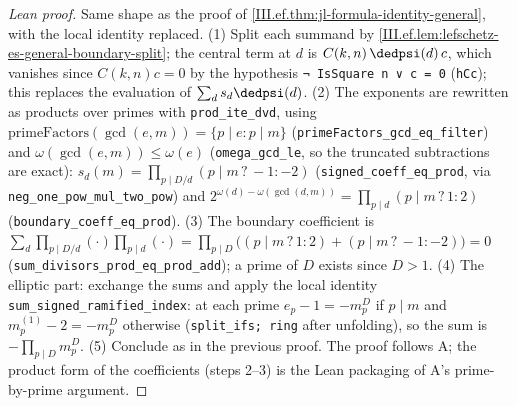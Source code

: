 \begin{proof}[Lean proof]
Same shape as the proof of \cref{III.ef.thm:jl-formula-identity-general}, with the local identity replaced. (1) Split each summand by \cref{III.ef.lem:lefschetz-es-general-boundary-split}; the central term at $d$ is $C(k,n)\,\dedpsi(d)\,c$, which vanishes since $C(k,n)c=0$ by the hypothesis \texttt{¬ IsSquare n ∨ c = 0} (\texttt{hCc}); this replaces the evaluation of $\sum_ds_d\dedpsi(d)$. (2) The exponents are rewritten as products over primes with \texttt{prod\_ite\_dvd}, using $\mathrm{primeFactors}(\gcd(e,m))=\{p\mid e: p\mid m\}$ (\texttt{primeFactors\_gcd\_eq\_filter}) and $\omega(\gcd(e,m))\le\omega(e)$ (\texttt{omega\_gcd\_le}, so the truncated subtractions are exact): $s_d(m)=\prod_{p\mid D/d}(p\mid m\,?\,-1:-2)$ (\texttt{signed\_coeff\_eq\_prod}, via \texttt{neg\_one\_pow\_mul\_two\_pow}) and $2^{\omega(d)-\omega(\gcd(d,m))}=\prod_{p\mid d}(p\mid m\,?\,1:2)$ (\texttt{boundary\_coeff\_eq\_prod}). (3) The boundary coefficient is $\sum_d\prod_{p\mid D/d}(\cdot)\prod_{p\mid d}(\cdot)=\prod_{p\mid D}\bigl((p\mid m\,?\,1:2)+(p\mid m\,?\,-1:-2)\bigr)=0$ (\texttt{sum\_divisors\_prod\_eq\_prod\_add}); a prime of $D$ exists since $D>1$. (4) The elliptic part: exchange the sums and apply the local identity \texttt{sum\_signed\_ramified\_index}: at each prime $e_p-1=-m^D_p$ if $p\mid m$ and $m^{(1)}_p-2=-m^D_p$ otherwise (\texttt{split\_ifs; ring} after unfolding), so the sum is $-\prod_{p\mid D}m^D_p$. (5) Conclude as in the previous proof. The proof follows A; the product form of the coefficients (steps 2--3) is the Lean packaging of A's prime-by-prime argument.
\end{proof}

